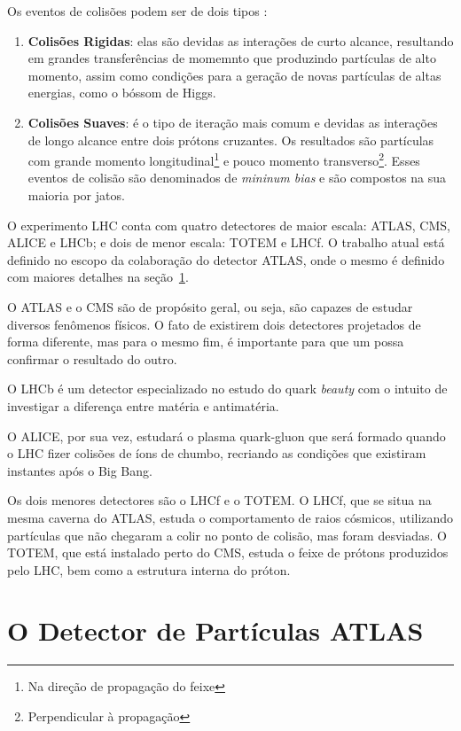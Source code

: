 Os eventos de colisões podem ser de dois tipos \cite{THESIS_LAR}:

\begin{enumerate}
\item \textbf{Colisões Rigidas}:
elas são devidas as interações de curto alcance,
resultando em grandes transferências de momemnto que produzindo partículas de
alto momento, assim como condições para a geração de novas partículas de altas
energias, como o bóssom de Higgs.
\item \textbf{Colisões Suaves}: 
é o tipo de iteração mais comum e devidas as interações de longo alcance entre dois prótons cruzantes. Os
resultados são partículas com grande momento longitudinal\footnote{Na direção de
propagação do feixe} e pouco momento transverso\footnote{Perpendicular à
propagação}. Esses eventos de colisão são
denominados de \emph{mininum bias} e são compostos na sua maioria por jatos.
\end{enumerate}

O experimento LHC conta com quatro detectores de maior escala: ATLAS, CMS, ALICE e
LHCb; e dois de menor escala: TOTEM e LHCf. O trabalho atual está definido no
escopo da colaboração do detector ATLAS, onde o mesmo é definido com maiores
detalhes na seção~\ref{sec:ATLAS}.

O ATLAS e o CMS são de propósito geral, ou seja, são capazes de estudar diversos
fenômenos físicos. O fato de existirem dois detectores projetados de forma
diferente, mas para o mesmo fim, é importante para que um possa confirmar o
resultado do outro.

O LHCb é um detector especializado no estudo do quark \textit{beauty} com o
intuito de investigar a diferença entre matéria e antimatéria.

O ALICE, por sua vez, estudará o plasma quark-gluon que será formado quando o
LHC fizer colisões de íons de chumbo, recriando as condições que existiram
instantes após o Big Bang.

Os dois menores detectores são o LHCf e o TOTEM. O LHCf, que se situa na mesma
caverna do ATLAS, estuda o comportamento de raios cósmicos, utilizando
partículas que não chegaram a colir no ponto de colisão, mas foram desviadas.
O TOTEM, que está instalado perto do CMS, estuda o feixe de prótons produzidos
pelo LHC, bem como a estrutura interna do próton.

\section{O Detector de Partículas ATLAS}
\label{sec:ATLAS}

